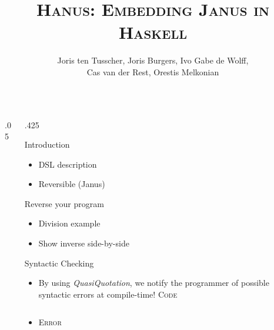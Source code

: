 \documentclass[final,hyperref={pdfpagelabels=false}]{beamer}
\title{\LARGE \textsc{Hanus: Embedding Janus in Haskell}} %
\author{\vspace{1cm} Joris ten Tusscher, Joris Burgers, Ivo Gabe de Wolff,\\ Cas van der Rest, Orestis Melkonian\vspace{1cm}} %
\institute{\Large \emph{Faculty of Science, Utrecht University}} %
\newcommand\sepsize{.05\textwidth}
\newcommand\colsize{.425\textwidth}
\newcommand{\code}[1]{\inputminted[frame=lines,framesep=1cm,baselinestretch=.9,linenos,fontsize=\scriptsize]{haskell}{code/#1.hs}}
\newcommand{\codeErr}[1]{\inputminted[frame=lines,framesep=1cm,baselinestretch=.9,fontsize=\scriptsize]{bash}{code/#1_err.hs}}
\begin{document}

\begin{frame}[t] %

\begin{columns}[t] %

\begin{column}{\sepsize}\end{column} %

\begin{column}{\colsize} %

            
\begin{block}{Introduction}
	\begin{itemize}
		\item DSL description
		\item Reversible (Janus)
	\end{itemize}
\end{block}

\begin{block}{Reverse your program}
	\begin{itemize}
		\item Division example
		\item Show inverse side-by-side
	\end{itemize}
\end{block}

\begin{block}{Syntactic Checking}
	\begin{itemize}
		\item By using \textit{QuasiQuotation}, we notify the programmer of possible syntactic errors at compile-time!
	\center
	\textsc{\small Code}\\ \vspace{1cm}
	\begin{minipage}{.8\textwidth}
	\code{syntax}
	\end{minipage}
	\vspace{1cm}
	\item \textsc{\small Error}\\ \vspace{1cm}
	\begin{minipage}{.8\textwidth}
	\codeErr{syntax}
	\end{minipage}	
	\end{itemize}
\end{block}


\end{column}
\end{columns}
\end{frame}
\end{document}
